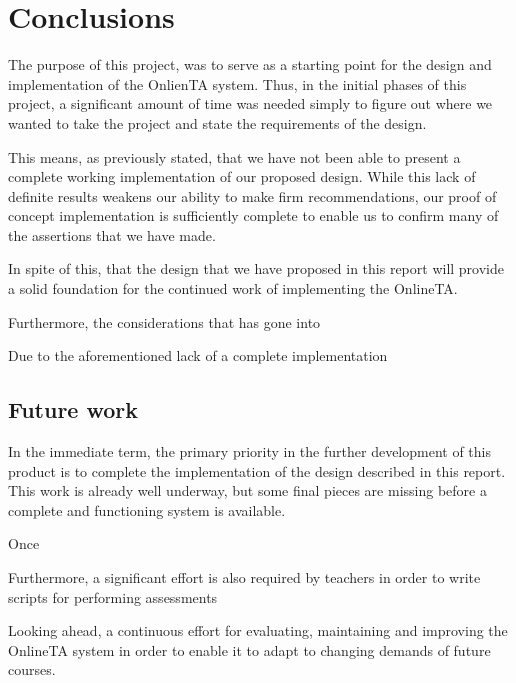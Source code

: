 \chapter{Conclusions}
The purpose of this project, was to serve as a starting point for the
design and implementation of the OnlienTA system. Thus, in the initial
phases of this project, a significant amount of time was needed simply
to figure out where we wanted to take the project and state
the requirements of the design.

This means, as previously stated, that we have not been able to
present a complete working implementation of our proposed
design. While this lack of definite results weakens our ability to
make firm recommendations, our proof of concept implementation is
sufficiently complete to enable us to confirm many of the
assertions that we have made.

In spite of this, that the design that we have proposed in this report
will provide a solid foundation for the continued work of implementing
the OnlineTA.

Furthermore, the considerations that has gone into 

Due to the aforementioned lack of a complete implementation





\section{Future work}
In the immediate term, the primary priority in the further development
of this product is to complete the implementation of the design
described in this report. This work is already well underway, but some
final pieces are missing before a complete and functioning system is
available.

Once 

Furthermore, a significant effort is also required by teachers in
order to write scripts for performing assessments


Looking ahead, a continuous effort for evaluating, maintaining and
improving the OnlineTA system in order to enable it to adapt to
changing demands of future courses.




